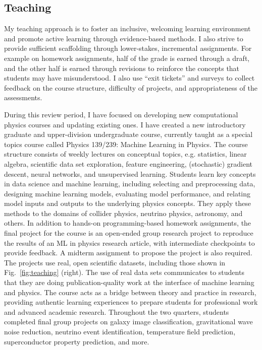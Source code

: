 \documentclass[11pt,letterpaper,notitlepage]{article}
\begin{document}
\vspace{-1ex}
\subsection*{Teaching}

My teaching approach is to foster an inclusive, welcoming learning environment and promote active learning through evidence-based methods.
I also strive to provide sufficient scaffolding through lower-stakes, incremental assignments.
For example on homework assignments, half of the grade is earned through a draft, and the other half is earned through revisions to reinforce the concepts that students may have misunderstood.
I also use ``exit tickets'' and surveys to collect feedback on the course structure, difficulty of projects, and appropriateness of the assessments.

During this review period, I have focused on developing new computational physics courses and updating existing ones.
I have created a new introductory graduate and upper-division undergraduate course, currently taught as a special topics course called Physics 139/239: Machine Learning in Physics.
The course structure consists of weekly lectures on conceptual topics, e.g. statistics, linear algebra, scientific data set exploration, feature engineering, (stochastic) gradient descent, neural networks, and unsupervised learning.
Students learn key concepts in data science and machine learning, including selecting and preprocessing data, designing machine learning models, evaluating model performance, and relating model inputs and outputs to the underlying physics concepts.
They apply these methods to the domains of collider physics, neutrino physics, astronomy, and others.
In addition to hands-on programming-based homework assignments, the final project for the course is an open-ended group research project to reproduce the results of an ML in physics research article, with intermediate checkpoints to provide feedback.
A midterm assignment to propose the project is also required.
The projects use real, open scientific datasets, including those shown in Fig.~\ref{fig:teaching} (right).
The use of real data sets communicates to students that they are doing publication-quality work at the interface of machine learning and physics.
The course acts as a bridge between theory and practice in research, providing authentic learning experiences to prepare students for professional work and advanced academic research.
Throughout the two quarters, students completed final group projects on galaxy image classification, gravitational wave noise reduction, neutrino event identification, temperature field prediction, superconductor property prediction, and more.
\end{document}
